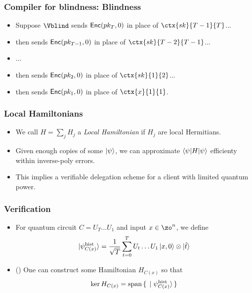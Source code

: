 \documentclass{beamer}
\begin{document}
\begin{frame}
	\frametitle{Compiler for blindness: Blindness}
	\begin{itemize}[<+->]
		\item Suppose $\Vblind$ sends $\mathsf{Enc}(pk_T, 0)$ in place of $\ctx{sk}{T-1}{T}$...
		\item then sends $\mathsf{Enc}(pk_{T-1}, 0)$ in place of $\ctx{sk}{T-2}{T-1}$...
		\item ...
		\item then sends $\mathsf{Enc}(pk_2, 0)$ in place of $\ctx{sk}{1}{2}$...
		\item then sends $\mathsf{Enc}(pk_1, 0)$ in place of $\ctx{x}{1}{1}$.
	\end{itemize}
\end{frame}

\begin{frame}
	\frametitle{Local Hamiltonians}
	\begin{itemize}[<+->]
		\item We call $H=\sum_j H_j$ a \emph{Local Hamiltonian} if $H_j$ are local Hermitians.
		\item Given enough copies of some $\ket\psi$, we can approximate $\braket{\psi|H|\psi}$ efficienty within inverse-poly errors.
		\item This implies a verifiable delegation scheme for a client with limited quantum power.
	\end{itemize}
\end{frame}

\begin{frame}
	\frametitle{Verification}
	\begin{itemize}[<+->]
		\item For quantum circuit $C=U_T\ldots U_1$ and input $x\in\zo^n$, we define $$\ket{\psi_{C(x)}^{\mathrm{hist}}}=\frac{1}{\sqrt{T}}\sum_{t=0}^TU_t\ldots U_1\ket{x,0}\otimes\ket{\hat{t}}$$
		\item (\cite{kitaev2002classical}) One can construct some Hamiltonian $H_{C(x)}$ so that $$\ker H_{C(x)}=\operatorname{span}\set{\ket{\psi_{C(x)}^{\mathrm{hist}}}}$$
	\end{itemize}
\end{frame}
\end{document}

